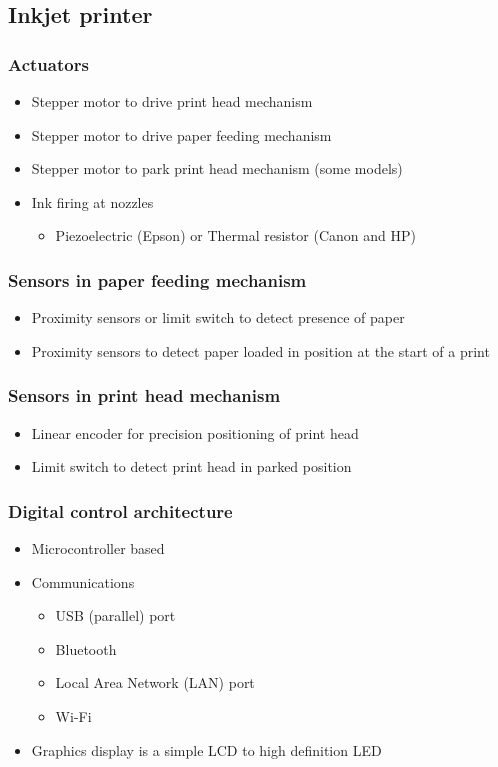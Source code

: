 \documentclass[11pt]{article}
\begin{document}
\subsection{Inkjet printer}
\label{sec:orgdb47651}

\subsubsection{Actuators}
\label{sec:org9c886d1}
\begin{itemize}
\item Stepper motor to drive print head mechanism
\item Stepper motor to drive paper feeding mechanism
\item Stepper motor to park print head mechanism (some models)
\item Ink firing at nozzles
\begin{itemize}
\item Piezoelectric (Epson) or Thermal resistor (Canon and HP)
\end{itemize}
\end{itemize}

\subsubsection{Sensors in paper feeding mechanism}
\label{sec:org1bb680b}
\begin{itemize}
\item Proximity sensors or limit switch to detect presence of paper
\item Proximity sensors to detect paper loaded in position at the start of a print
\end{itemize}

\subsubsection{Sensors in print head mechanism}
\label{sec:org86bc396}
\begin{itemize}
\item Linear encoder for precision positioning of print head
\item Limit switch to detect print head in parked position
\end{itemize}

\subsubsection{Digital control architecture}
\label{sec:orgd6a471e}
\begin{itemize}
\item Microcontroller based
\item Communications
\begin{itemize}
\item USB (parallel) port
\item Bluetooth
\item Local Area Network (LAN) port
\item Wi-Fi
\end{itemize}
\item Graphics display is a simple LCD to high definition LED
\end{itemize}
\end{document}
